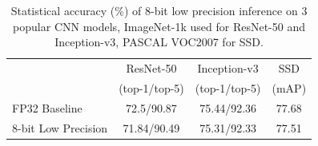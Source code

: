 \begin{table}
\centering
\small
\setlength\tabcolsep{2pt}
\caption{Statistical accuracy (\%) of 8-bit low precision inference on 3 popular CNN models, ImageNet-1k used for ResNet-50 and Inception-v3, PASCAL VOC2007 for SSD.}
\label{tab:accuracy}
\begin{tabular}{p{1.3in}ccc}
    \toprule
           & ResNet-50 & Inception-v3 & SSD  \\
           & (top-1/top-5) & (top-1/top-5) & (mAP) \\
    \midrule
FP32 Baseline & 72.5/90.87 & 75.44/92.36 & 77.68 \\

8-bit Low Precision & 71.84/90.49 & 75.31/92.33 & 77.51 \\
  \bottomrule
\end{tabular}
\end{table}